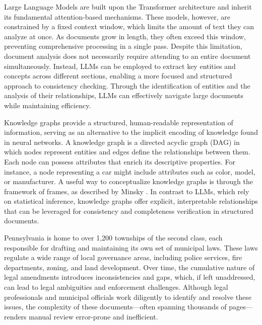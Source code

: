 Large Language Models are built upon the Transformer architecture and inherit its fundamental attention-based mechanisms. These models, however, are constrained by a fixed context window, which limits the amount of text they can analyze at once. As documents grow in length, they often exceed this window, preventing comprehensive processing in a single pass. Despite this limitation, document analysis does not necessarily require attending to an entire document simultaneously. Instead, LLMs can be employed to extract key entities and concepts across different sections, enabling a more focused and structured approach to consistency checking. Through the identification of entities and the analysis of their relationships, LLMs can effectively navigate large documents while maintaining efficiency.

Knowledge graphs provide a structured, human-readable representation of information, serving as an alternative to the implicit encoding of knowledge found in neural networks. A knowledge graph is a directed acyclic graph (DAG) in which nodes represent entities and edges define the relationships between them. Each node can possess attributes that enrich its descriptive properties. For instance, a node representing a car might include attributes such as color, model, or manufacturer. A useful way to conceptualize knowledge graphs is through the framework of frames, as described by Minsky \parencite{RefWorks:RefID:78-minsky1974framework}. In contrast to LLMs, which rely on statistical inference, knowledge graphs offer explicit, interpretable relationships that can be leveraged for consistency and completeness verification in structured documents.

Pennsylvania is home to over 1,200 townships of the second class, each responsible for drafting and maintaining its own set of municipal laws. These laws regulate a wide range of local governance areas, including police services, fire departments, zoning, and land development. Over time, the cumulative nature of legal amendments introduces inconsistencies and gaps, which, if left unaddressed, can lead to legal ambiguities and enforcement challenges. Although legal professionals and municipal officials work diligently to identify and resolve these issues, the complexity of these documents—often spanning thousands of pages—renders manual review error-prone and inefficient.

